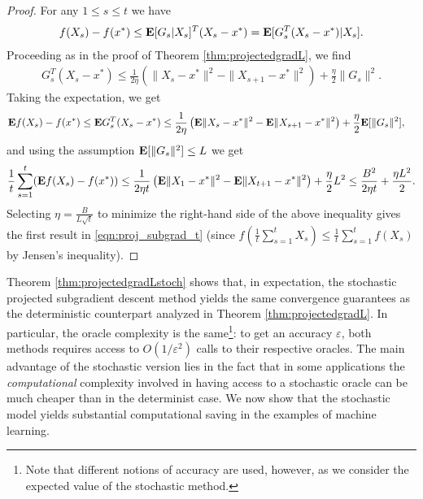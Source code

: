 \begin{proof}
For any $1 \leq s \leq t$ we have
\begin{align*}
	f(X_s) - f(x^*)
	\le \mathbf{E} [G_s|X_s]^T(X_s - x^*)
	= \mathbf{E} [G_s^T(X_s - x^*)|X_s].
\end{align*}
Proceeding as in the proof of Theorem \ref{thm:projectedgradL}, we find
\begin{align*}
	G_s^T(X_s - x^*)
	\le \frac{1}{2\eta} \left( \|X_s - x^*\|^2 - \|X_{s+1} - x^*\|^2 \right) + \frac{\eta}{2} \|G_s\|^2.
\end{align*}
Taking the expectation, we get
\begin{align*}
	\mathbf{E} f(X_s) - f(x^*) &\leq 
	\mathbf{E} G_s^T(X_s - x^*) 
	\le \frac{1}{2\eta} \left( \mathbf{E}\|X_s - x^*\|^2 - \mathbf{E}\|X_{s+1} - x^*\|^2 \right) + \frac{\eta}{2} \mathbf{E}[\|G_s\|^2],
\end{align*}
and using the assumption $\mathbf{E}[\|G_s\|^2]\le L$ we get
\[
\frac{1}{t} \sum_{s=1}^t (\mathbf{E} f(X_s) - f(x^*)) \leq \frac{1}{2 \eta t} \left( \mathbf{E}\| X_1 - x^* \|^2 - \mathbf{E}\| X_{t+1} - x^* \|^2 \right) + \frac{\eta}{2} L^2 \leq \frac{B^2}{2 \eta t} + \frac{\eta L^2 }{2}.
\]
Selecting $\eta = \frac{B}{L\sqrt{t}}$ to minimize the right-hand side of the above inequality gives the first result in \eqref{eqn:proj_subgrad_t} (since $f\left(\frac{1}{t}\sum_{s=1}^t X_s \right) \leq \frac{1}{t} \sum_{s=1}^t f(X_s)$ by Jensen's inequality).
\end{proof}

Theorem \ref{thm:projectedgradLstoch} shows that, in expectation, the stochastic projected subgradient descent method yields the same convergence guarantees as the deterministic counterpart analyzed in Theorem \ref{thm:projectedgradL}.  In particular, the oracle complexity is the same\footnote{Note that different notions of accuracy are used, however, as we consider the expected value of the stochastic method.}: to get an accuracy $\varepsilon$, both methods requires access to $O(1/\varepsilon^2)$ calls to their respective oracles. The main advantage of the stochastic version lies in the fact that in some applications the \emph{computational} complexity involved in having access to a stochastic oracle can be much cheaper than in the determinist case. We now show that the stochastic model yields substantial computational saving in the examples of machine learning.

